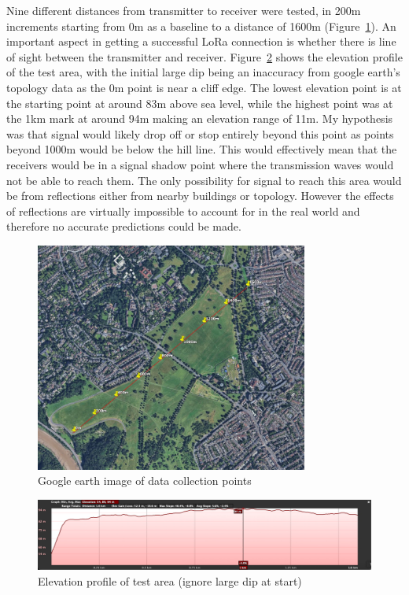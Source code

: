 Nine different distances from transmitter to receiver were tested, in 200m
increments starting from 0m as a baseline to a distance of 1600m
(Figure~\ref{fig:range-test-markers}). An important aspect in getting a
successful LoRa connection is whether there is line of sight between the
transmitter and receiver. Figure~\ref{fig:range-test-elevation} shows the
elevation profile of the test area, with the initial large dip being an
inaccuracy from google earth's topology data as the 0m point is near a cliff
edge. The lowest elevation point is at the starting point at around 83m above
sea level, while the highest point was at the 1km mark at around 94m making an
elevation range of 11m. My hypothesis was that signal would likely drop off or
stop entirely beyond this point as points beyond 1000m would be below the hill
line. This would effectively mean that the receivers would be in a signal shadow
point where the transmission waves would not be able to reach them. The only
possibility for signal to reach this area would be from reflections either from
nearby buildings or topology. However the effects of reflections are virtually
impossible to account for in the real world and therefore no accurate
predictions could be made.

\begin{figure}[H]
    \centering
    \includegraphics[width=0.8\textwidth]{contents/23-hw-development/23-fig/range-test-markers.jpg}
    \caption{Google earth image of data collection points}
    \label{fig:range-test-markers}
\end{figure}


\begin{figure}[H]
    \centering
    \includegraphics[width=1\textwidth]{contents/23-hw-development/23-fig/range-test-elevation-profile.jpg}
    \caption{Elevation profile of test area (ignore large dip at start)}
    \label{fig:range-test-elevation}
\end{figure}

